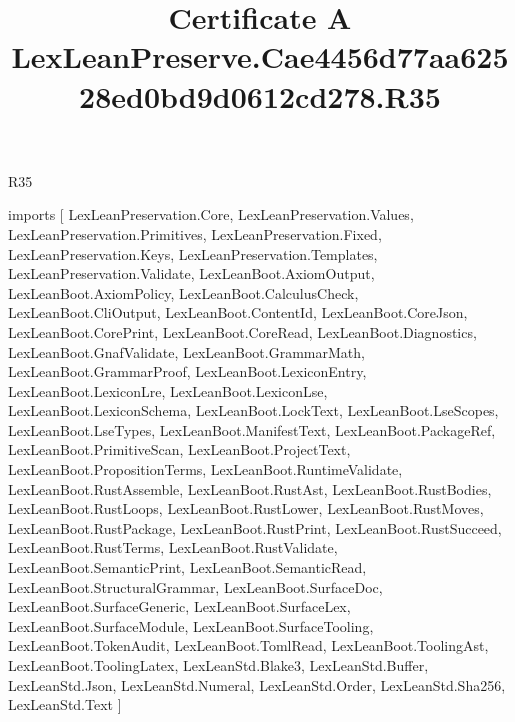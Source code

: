 \begin{lexlean}{R35}
\title{Certificate A LexLeanPreserve.Cae4456d77aa62528ed0bd9d0612cd278.R35}
\begin{coremodule}
imports [
  LexLeanPreservation.Core,
  LexLeanPreservation.Values,
  LexLeanPreservation.Primitives,
  LexLeanPreservation.Fixed,
  LexLeanPreservation.Keys,
  LexLeanPreservation.Templates,
  LexLeanPreservation.Validate,
  LexLeanBoot.AxiomOutput,
  LexLeanBoot.AxiomPolicy,
  LexLeanBoot.CalculusCheck,
  LexLeanBoot.CliOutput,
  LexLeanBoot.ContentId,
  LexLeanBoot.CoreJson,
  LexLeanBoot.CorePrint,
  LexLeanBoot.CoreRead,
  LexLeanBoot.Diagnostics,
  LexLeanBoot.GnafValidate,
  LexLeanBoot.GrammarMath,
  LexLeanBoot.GrammarProof,
  LexLeanBoot.LexiconEntry,
  LexLeanBoot.LexiconLre,
  LexLeanBoot.LexiconLse,
  LexLeanBoot.LexiconSchema,
  LexLeanBoot.LockText,
  LexLeanBoot.LseScopes,
  LexLeanBoot.LseTypes,
  LexLeanBoot.ManifestText,
  LexLeanBoot.PackageRef,
  LexLeanBoot.PrimitiveScan,
  LexLeanBoot.ProjectText,
  LexLeanBoot.PropositionTerms,
  LexLeanBoot.RuntimeValidate,
  LexLeanBoot.RustAssemble,
  LexLeanBoot.RustAst,
  LexLeanBoot.RustBodies,
  LexLeanBoot.RustLoops,
  LexLeanBoot.RustLower,
  LexLeanBoot.RustMoves,
  LexLeanBoot.RustPackage,
  LexLeanBoot.RustPrint,
  LexLeanBoot.RustSucceed,
  LexLeanBoot.RustTerms,
  LexLeanBoot.RustValidate,
  LexLeanBoot.SemanticPrint,
  LexLeanBoot.SemanticRead,
  LexLeanBoot.StructuralGrammar,
  LexLeanBoot.SurfaceDoc,
  LexLeanBoot.SurfaceGeneric,
  LexLeanBoot.SurfaceLex,
  LexLeanBoot.SurfaceModule,
  LexLeanBoot.SurfaceTooling,
  LexLeanBoot.TokenAudit,
  LexLeanBoot.TomlRead,
  LexLeanBoot.ToolingAst,
  LexLeanBoot.ToolingLatex,
  LexLeanStd.Blake3,
  LexLeanStd.Buffer,
  LexLeanStd.Json,
  LexLeanStd.Numeral,
  LexLeanStd.Order,
  LexLeanStd.Sha256,
  LexLeanStd.Text
]


\end{coremodule}
\end{lexlean}
